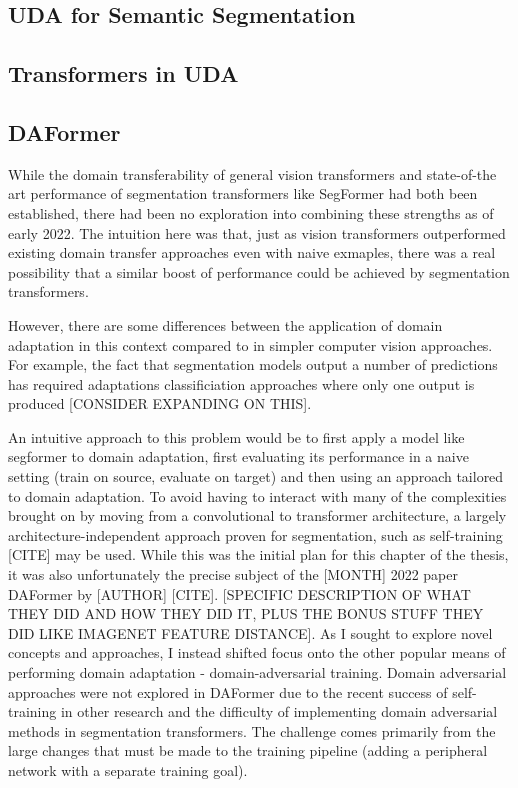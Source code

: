 \documentclass[a4paper,12pt]{report}
\begin{document}
\subsection*{UDA for Semantic Segmentation}

\subsection*{Transformers in UDA}

\subsection*{DAFormer}

While the domain transferability of general vision transformers and state-of-the art performance of segmentation transformers like SegFormer had both been established, there had been no exploration into combining these strengths as of early 2022.
The intuition here was that, just as vision transformers outperformed existing domain transfer approaches even with naive exmaples, there was a real possibility that a similar boost of performance could be achieved by segmentation transformers.

However, there are some differences between the application of domain adaptation in this context compared to in simpler computer vision approaches. For example, the fact that segmentation models output a number of predictions has required adaptations classificiation approaches where only one output is produced [CONSIDER EXPANDING ON THIS].

An intuitive approach to this problem would be to first apply a model like segformer to domain adaptation, first evaluating its performance in a naive setting (train on source, evaluate on target) and then using an approach tailored to domain adaptation. To avoid having to interact with many of the complexities brought on by moving from a convolutional to transformer architecture, a largely architecture-independent approach proven for segmentation, such as self-training [CITE] may be used. While this was the initial plan for this chapter of the thesis, it was also unfortunately the precise subject of the [MONTH] 2022 paper DAFormer by [AUTHOR] [CITE]. [SPECIFIC DESCRIPTION OF WHAT THEY DID AND HOW THEY DID IT, PLUS THE BONUS STUFF THEY DID LIKE IMAGENET FEATURE DISTANCE]. As I sought to explore novel concepts and approaches, I instead shifted focus onto the other popular means of performing domain adaptation - domain-adversarial training. Domain adversarial approaches were not explored in DAFormer due to the recent success of self-training in other research and the difficulty of implementing domain adversarial methods in segmentation transformers. The challenge comes primarily from the large changes that must be made to the training pipeline (adding a peripheral network with a separate training goal).
\end{document}

